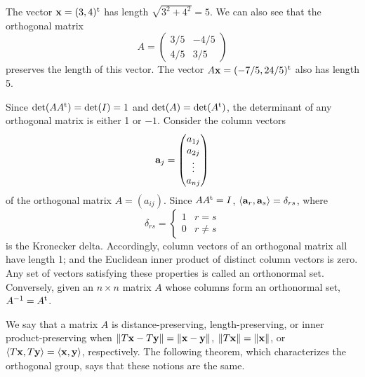  
\begin{example}{}
The vector ${\bold x} =(3,4)^{\rm t}$ has length $\sqrt{3^2 + 4^2} = 5$.  We
can also see that the orthogonal matrix 
\[
A=
\begin{pmatrix}
3/5 & -4/5 \\
4/5 & 3/5
\end{pmatrix}
\]
preserves the length of this vector. The vector $A{\bold x} =
(-7/5,24/5)^{\rm t}$ also has length 5. 
\end{example}
 
 
Since $\det(A A^{\rm t}) = \det(I) = 1$ and $\det(A) = \det( A^{\rm t}
)$, the determinant of any orthogonal matrix is either 1 or $-1$.
Consider the column vectors 
\[
{\bold a}_j
=
\begin{pmatrix}
a_{1j} \\ a_{2j} \\ \vdots \\ a_{nj}
\end{pmatrix}
\]
of the orthogonal matrix
$A= (a_{ij})$. Since
$AA^{\rm t} = I$,
$\langle {\bold a}_r, {\bold a}_s \rangle = \delta_{rs}$,
where
\[
\delta_{rs}
=
\left\{
\begin{array}{cc}
1 & r = s \\
0 & r \neq s
\end{array}
\right.
\]
is the Kronecker delta. Accordingly, column
vectors of an orthogonal matrix all have length 1; and the Euclidean
inner product of distinct column vectors is zero. Any set of vectors
satisfying these properties is called an {\bfi orthonormal
set}. Conversely, given an $n \times n$ matrix
$A$ whose columns form an orthonormal set, $A^{-1} = A^{\rm t}$.
 
 
We say that a matrix $A$ is {\bfi
distance-preserving}, {\bfi
length-preserving}, or {\bfi inner
product-preserving\/} when $\|
T{\bold x}- T{\bold y} \| =\| {\bold x}- {\bold y} \|$, $\| T{\bold x}
\| =\| {\bold x} \|$, or $\langle  T{\bold x}, T{\bold y} \rangle =
\langle {\bold x},{\bold y} \rangle$, respectively. The following
theorem, which characterizes the orthogonal group, says that these
notions are the same.
 
